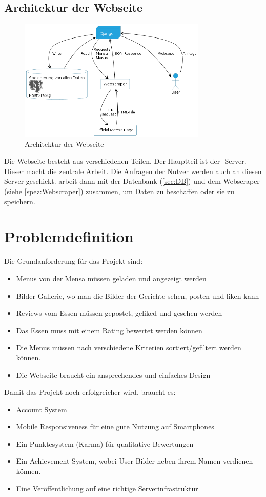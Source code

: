 \subsection{Architektur der Webseite}
\begin{figure}[ht]
    \centering
    \includegraphics[width=0.8\textwidth]{images/Webseite.png}
    \caption{Architektur der Webseite}
    \label{fig:Website}
\end{figure}

Die Webseite besteht aus verschiedenen Teilen. Der Hauptteil ist der
-Server. Dieser macht die zentrale Arbeit. Die Anfragen der Nutzer
werden auch an diesen Server geschickt.  arbeit dann mit der
Datenbank (\ref{sec:DB}) und dem Webscraper (siehe \ref{spez:Webscraper})
zusammen, um Daten zu beschaffen oder sie zu speichern.

\section{Problemdefinition}\label{sec:problemdefinition}

Die Grundanforderung für das Projekt sind:
\begin{itemize}
    \item Menus von der Mensa müssen geladen und angezeigt werden
    \item Bilder Gallerie, wo man die Bilder der Gerichte sehen, posten und liken kann
    \item Reviews vom Essen müssen gepostet, geliked und gesehen werden
    \item Das Essen muss mit einem Rating bewertet werden können
    \item Die Menus müssen nach verschiedene Kriterien sortiert/gefiltert werden können.
    \item Die Webseite braucht ein ansprechendes und einfaches Design
\end{itemize}

Damit das Projekt noch erfolgreicher wird, braucht es:
\begin{itemize}
    \item Account System
    \item Mobile Responsiveness für eine gute Nutzung auf Smartphones
    \item Ein Punktesystem (Karma) für qualitative Bewertungen
    \item Ein Achievement System, wobei User Bilder neben ihrem Namen verdienen können.
    \item Eine Veröffentlichung auf eine richtige Serverinfrastruktur
\end{itemize}
